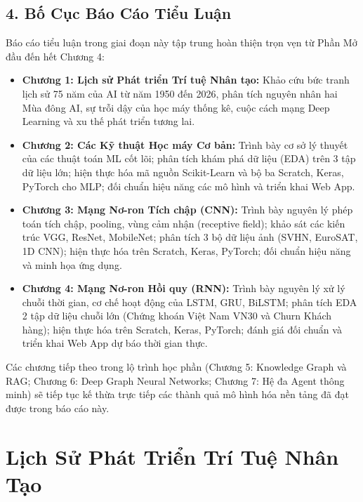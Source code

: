 \documentclass[12pt,a4paper]{report}
\begin{document}
\section*{4. Bố Cục Báo Cáo Tiểu Luận}

Báo cáo tiểu luận trong giai đoạn này tập trung hoàn thiện trọn vẹn từ Phần Mở đầu đến hết Chương 4:
\begin{itemize}[leftmargin=1.2cm]
    \item \textbf{Chương 1: Lịch sử Phát triển Trí tuệ Nhân tạo:} Khảo cứu bức tranh lịch sử 75 năm của AI từ năm 1950 đến 2026, phân tích nguyên nhân hai Mùa đông AI, sự trỗi dậy của học máy thống kê, cuộc cách mạng Deep Learning và xu thế phát triển tương lai.
    \item \textbf{Chương 2: Các Kỹ thuật Học máy Cơ bản:} Trình bày cơ sở lý thuyết của các thuật toán ML cốt lõi; phân tích khám phá dữ liệu (EDA) trên 3 tập dữ liệu lớn; hiện thực hóa mã nguồn Scikit-Learn và bộ ba Scratch, Keras, PyTorch cho MLP; đối chuẩn hiệu năng các mô hình và triển khai Web App.
    \item \textbf{Chương 3: Mạng Nơ-ron Tích chập (CNN):} Trình bày nguyên lý phép toán tích chập, pooling, vùng cảm nhận (receptive field); khảo sát các kiến trúc VGG, ResNet, MobileNet; phân tích 3 bộ dữ liệu ảnh (SVHN, EuroSAT, 1D CNN); hiện thực hóa trên Scratch, Keras, PyTorch; đối chuẩn hiệu năng và minh họa ứng dụng.
    \item \textbf{Chương 4: Mạng Nơ-ron Hồi quy (RNN):} Trình bày nguyên lý xử lý chuỗi thời gian, cơ chế hoạt động của LSTM, GRU, BiLSTM; phân tích EDA 2 tập dữ liệu chuỗi lớn (Chứng khoán Việt Nam VN30 và Churn Khách hàng); hiện thực hóa trên Scratch, Keras, PyTorch; đánh giá đối chuẩn và triển khai Web App dự báo thời gian thực.
\end{itemize}

\noindent Các chương tiếp theo trong lộ trình học phần (Chương 5: Knowledge Graph và RAG; Chương 6: Deep Graph Neural Networks; Chương 7: Hệ đa Agent thông minh) sẽ tiếp tục kế thừa trực tiếp các thành quả mô hình hóa nền tảng đã đạt được trong báo cáo này.

\newpage


\chapter{Lịch Sử Phát Triển Trí Tuệ Nhân Tạo}
\end{document}
